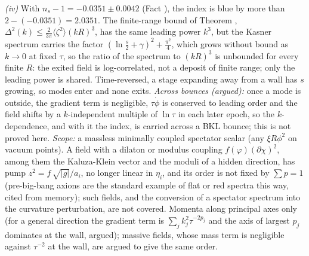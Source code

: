 \emph{(iv)} With $n_{s} - 1 = -0.0351 \pm 0.0042$ (Fact ), the index is blue by more than $2 - (-0.0351) = 2.0351$. The finite-range bound of Theorem , $\Delta^{2}(k) \le \tfrac{2}{3\pi}\langle\zeta^{2}\rangle(kR)^{3}$, has the same leading power $k^{3}$, but the Kasner spectrum carries the factor $(\ln\tfrac{s}{2} + \gamma)^{2} + \tfrac{\pi^{2}}{4}$, which grows without bound as $k \to 0$ at fixed $\tau$, so the ratio of the spectrum to $(kR)^{3}$ is unbounded for every finite $R$: the exited field is log-correlated, not a deposit of finite range; only the leading power is shared. Time-reversed, a stage expanding away from a wall has $s$ growing, so modes enter and none exits. \emph{Across bounces (argued):} once a mode is outside, the gradient term is negligible, $\tau\dot\phi$ is conserved to leading order and the field shifts by a $k$-independent multiple of $\ln\tau$ in each later epoch, so the $k$-dependence, and with it the index, is carried across a BKL bounce; this is not proved here. \emph{Scope:} a massless minimally coupled spectator scalar (any $\xi R\phi^{2}$ on vacuum points). A field with a dilaton or modulus coupling $f(\varphi)(\partial\chi)^{2}$, among them the Kaluza-Klein vector and the moduli of a hidden direction, has pump $z^{2} = f\,\sqrt{|g|}/a_{i}$, no longer linear in $\eta_{i}$, and its order is not fixed by $\sum p = 1$ (pre-big-bang axions are the standard example of flat or red spectra this way, cited from memory); such fields, and the conversion of a spectator spectrum into the curvature perturbation, are not covered. Momenta along principal axes only (for a general direction the gradient term is $\sum_{j}k_{j}^{2}\tau^{-2p_{j}}$ and the axis of largest $p_{j}$ dominates at the wall, argued); massive fields, whose mass term is negligible against $\tau^{-2}$ at the wall, are argued to give the same order.
